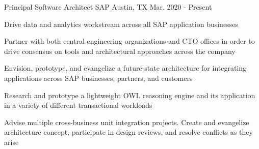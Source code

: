 


\begin{cventries}


\cventry
{Principal Software Architect}
{SAP}
{Austin, TX}
{Mar. 2020 - Present}
{
  \begin{cvitems}
  \item {Drive data and analytics workstream across all SAP application businesses}
  \item {Partner with both central engineering organizations and CTO offices in order to drive consensus on tools and architectural approaches across the company}
  \item {Envision, prototype, and evangelize a future-state architecture for integrating applications across SAP businesses, partners, and customers}
  \item {Research and prototype a lightweight OWL reasoning engine and its application in a variety of different transactional workloads}
  \item {Advise multiple cross-business unit integration projects. Create and evangelize architecture concept, participate in design reviews, and resolve conflicts as they arise}
  \end{cvitems}
}



\end{cventries}
